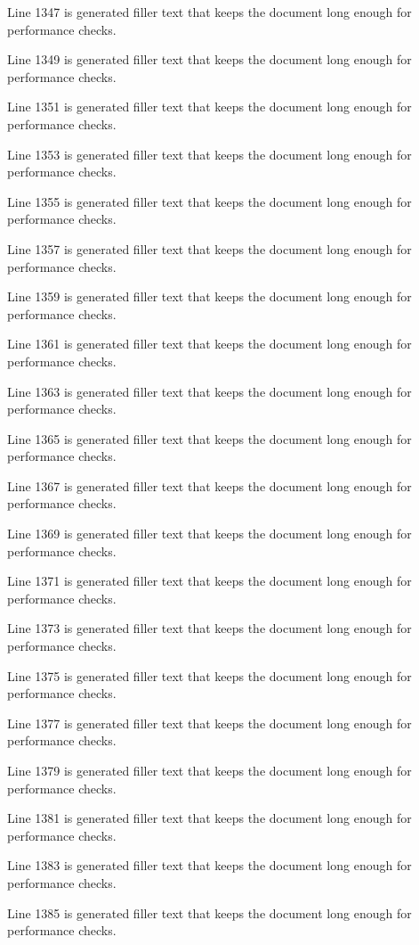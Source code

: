Line 1347 is generated filler text that keeps the document long enough for performance checks.

Line 1349 is generated filler text that keeps the document long enough for performance checks.

Line 1351 is generated filler text that keeps the document long enough for performance checks.

Line 1353 is generated filler text that keeps the document long enough for performance checks.

Line 1355 is generated filler text that keeps the document long enough for performance checks.

Line 1357 is generated filler text that keeps the document long enough for performance checks.

Line 1359 is generated filler text that keeps the document long enough for performance checks.

Line 1361 is generated filler text that keeps the document long enough for performance checks.

Line 1363 is generated filler text that keeps the document long enough for performance checks.

Line 1365 is generated filler text that keeps the document long enough for performance checks.

Line 1367 is generated filler text that keeps the document long enough for performance checks.

Line 1369 is generated filler text that keeps the document long enough for performance checks.

Line 1371 is generated filler text that keeps the document long enough for performance checks.

Line 1373 is generated filler text that keeps the document long enough for performance checks.

Line 1375 is generated filler text that keeps the document long enough for performance checks.

Line 1377 is generated filler text that keeps the document long enough for performance checks.

Line 1379 is generated filler text that keeps the document long enough for performance checks.

Line 1381 is generated filler text that keeps the document long enough for performance checks.

Line 1383 is generated filler text that keeps the document long enough for performance checks.

Line 1385 is generated filler text that keeps the document long enough for performance checks.

